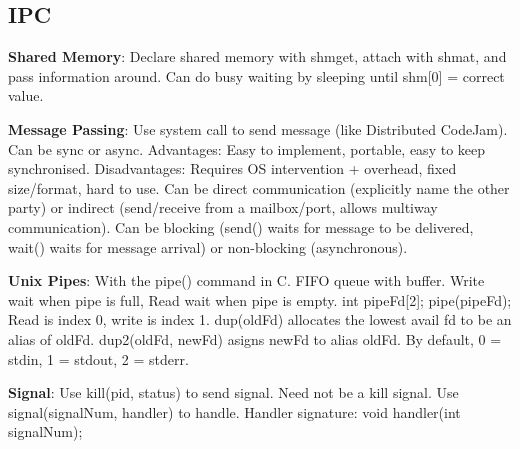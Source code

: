 \documentclass[a4paper,landscape]{article}
\newcommand{\rntopic}[1]{\vspace{-1.5em}\subsection*{#1}\vspace{-0.5em}}
\newcommand{\rnname}[1]{\textbf{#1}}
\begin{document}
\begin{multicols*}{4}
\begin{flatitemize}
\end{flatitemize}
\rntopic{IPC}
\begin{flatitemize}

\item \rnname{Shared Memory}: Declare shared memory with shmget, attach with shmat, and pass information around. Can do busy waiting by sleeping until shm[0] = correct value.

\item \rnname{Message Passing}: Use system call to send message (like Distributed CodeJam). Can be sync or async. Advantages: Easy to implement, portable, easy to keep synchronised. Disadvantages: Requires OS intervention + overhead, fixed size/format, hard to use. Can be direct communication (explicitly name the other party) or indirect (send/receive from a mailbox/port, allows multiway communication). Can be blocking (send() waits for message to be delivered, wait() waits for message arrival) or non-blocking (asynchronous).

\item \rnname{Unix Pipes}: With the pipe() command in C. FIFO queue with buffer. Write wait when pipe is full, Read wait when pipe is empty. int pipeFd[2]; pipe(pipeFd); Read is index 0, write is index 1. dup(oldFd) allocates the lowest avail fd to be an alias of oldFd. dup2(oldFd, newFd) asigns newFd to alias oldFd. By default, 0 = stdin, 1 = stdout, 2 = stderr.

\item \rnname{Signal}: Use kill(pid, status) to send signal. Need not be a kill signal. Use signal(signalNum, handler) to handle. Handler signature: void handler(int signalNum);

\end{flatitemize}


\end{multicols*}
\end{document}

